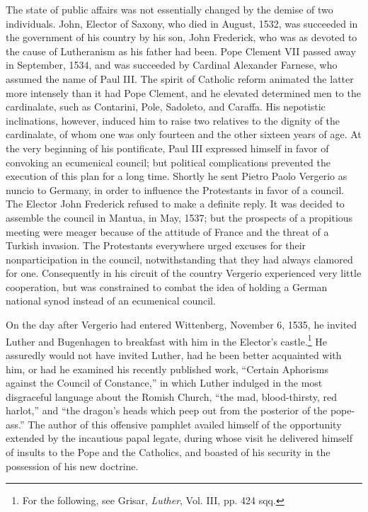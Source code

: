 The state of public affairs was not essentially changed by the demise
of two individuals. John, Elector of Saxony, who died in August,
1532, was succeeded in the government of his country by his son,
John Frederick, who was as devoted to the cause of Lutheranism as
his father had been. Pope Clement VII passed away in September,
1534, and was succeeded by Cardinal Alexander Farnese, who assumed
the name of Paul III. The spirit of Catholic reform animated the latter
more intensely than it had Pope Clement, and he elevated determined
men to the cardinalate, such as Contarini, Pole, Sadoleto, and Caraffa.
His nepotistic inclinations, however, induced him to raise two relatives
to the dignity of the cardinalate, of whom one was only fourteen
and the other sixteen years of age. At the very beginning of his
pontificate, Paul III expressed himself in favor of convoking an
ecumenical council; but political complications prevented the execution
of this plan for a long time. Shortly he sent Pietro Paolo
Vergerio as nuncio to Germany, in order to influence the Protestants
in favor of a council. The Elector John Frederick refused to make
a definite reply. It was decided to assemble the council in Mantua,
in May, 1537; but the prospects of a propitious meeting were meager
because of the attitude of France and the threat of a Turkish invasion.
The Protestants everywhere urged excuses for their nonparticipation
in the council, notwithstanding that they had always
clamored for one. Consequently in his circuit of the country Vergerio
experienced very little cooperation, but was constrained to combat
the idea of holding a German national synod instead of an ecumenical
council.

On the day after Vergerio had entered Wittenberg, November 6,
1535, he invited Luther and Bugenhagen to breakfast with him in
the Elector’s castle.\footnote{For the following, see Grisar, \textit{Luther}, Vol. III, pp. 424 sqq.}
He assuredly would not have invited Luther,
had he been better acquainted with him, or had he examined his
recently published work, “Certain Aphorisms against the Council of
Constance,” in which Luther indulged in the most disgraceful language
about the Romish Church, “the mad, blood-thirsty, red harlot,”
and “the dragon’s heads which peep out from the posterior of the
pope-ass.” The author of this offensive pamphlet availed himself of
the opportunity extended by the incautious papal legate, during
whose visit he delivered himself of insults to the Pope and the
Catholics, and boasted of his security in the possession of his new
doctrine.

